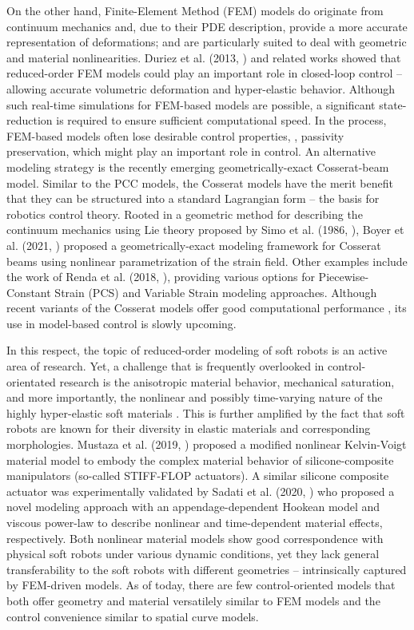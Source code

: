 On the other hand, Finite-Element Method (FEM) models do originate from continuum mechanics and, due to their PDE description, provide a more accurate representation of deformations; and are particularly suited to deal with geometric and material nonlinearities. Duriez et al. (2013, \cite{Duriez2013}) and related works \cite{Coevoet2017,Largilliere2015,Goury2018} showed that reduced-order FEM models could play an important role in closed-loop control -- allowing accurate volumetric deformation and hyper-elastic behavior. Although such real-time simulations for FEM-based models are possible, a significant state-reduction is required to ensure sufficient computational speed. In the process, FEM-based models often lose desirable control properties, \eg, passivity preservation, which might play an important role in control. An alternative modeling strategy is the recently emerging geometrically-exact Cosserat-beam model. Similar to the PCC models, the Cosserat models have the merit benefit that they can be structured into a standard Lagrangian form -- the basis for robotics control theory. Rooted in a geometric method for describing the continuum mechanics using Lie theory proposed by Simo et al. (1986, \cite{Simo1986}), Boyer et al. (2021, \cite{Boyer2010, Boyer2021}) proposed a geometrically-exact modeling framework for Cosserat beams using nonlinear parametrization of the strain field. Other examples include the work of Renda et al. (2018, \cite{Renda2018,Renda2020}), providing various options for Piecewise-Constant Strain (PCS) and Variable Strain modeling approaches. Although recent variants of the Cosserat models offer good computational performance \cite{Till2019,Grazioso2019}, its use in model-based control is slowly upcoming.

In this respect, the topic of reduced-order modeling of soft robots is an active area of research. Yet, a challenge that is frequently overlooked in control-orientated research is the anisotropic material behavior, mechanical saturation, and more importantly, the nonlinear and possibly time-varying nature of the highly hyper-elastic soft materials \cite{Falkenhahn2015, Mochiyama2003, Till2019, Tatlicioglu2007}. This is further amplified by the fact that soft robots are known for their diversity in elastic materials and corresponding morphologies. Mustaza et al. (2019, \cite{Mustaza2019}) proposed a modified nonlinear Kelvin-Voigt material model to embody the complex material behavior of silicone-composite manipulators (so-called STIFF-FLOP actuators). A similar silicone composite actuator was experimentally validated by Sadati et al. (2020, \cite{Sadati2020}) who proposed a novel modeling approach with an appendage-dependent Hookean model and viscous power-law to describe nonlinear and time-dependent material effects, respectively. Both nonlinear material models show good correspondence with physical soft robots under various dynamic conditions, yet they lack general transferability to the soft robots with different geometries -- intrinsically captured by FEM-driven models. As of today, there are few control-oriented models that both offer geometry and material versatilely similar to FEM models and the control convenience similar to spatial curve models.

